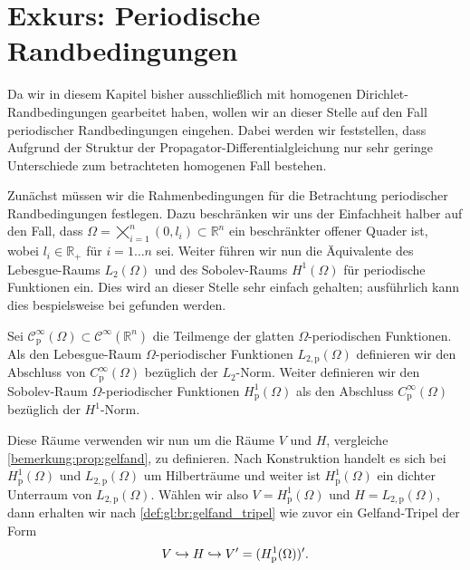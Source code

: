 

\section{Exkurs: Periodische Randbedingungen} %
\label{sec:ps:pr:periodische_randbedingungen}

Da wir in diesem Kapitel bisher ausschließlich mit homogenen Dirichlet-Randbedingungen gearbeitet haben, wollen wir an dieser Stelle auf den Fall periodischer Randbedingungen eingehen.
Dabei werden wir feststellen, dass Aufgrund der Struktur der Propagator-Differentialgleichung nur sehr geringe Unterschiede zum betrachteten homogenen Fall bestehen.

Zunächst müssen wir die Rahmenbedingungen für die Betrachtung periodischer Randbedingungen festlegen.
Dazu beschränken wir uns der Einfachheit halber auf den Fall, dass $\Omega = \bigtimes_{i = 1}^{n} (0, l_{i}) \subset \mathbb{R}^{n}$ ein beschränkter offener Quader ist, wobei $l_{i} \in \mathbb{R}_{+}$ für $i = 1 \dots n$ sei.
Weiter führen wir nun die Äquivalente des Lebesgue-Raums $L_{2}(\Omega)$ und des Sobolev-Raums $H^{1}(\Omega)$ für periodische Funktionen ein.
Dies wird an dieser Stelle sehr einfach gehalten; ausführlich kann dies bespielsweise bei \cite{??} gefunden werden.

\begin{Definition}
    Sei $\mathcal C_{\text{p}}^{\infty}(\Omega) \subset \mathcal C^{\infty}(\mathbb{R}^{n})$ die Teilmenge der glatten $\Omega$-periodischen Funktionen.
    Als den Lebesgue-Raum $\Omega$-periodischer Funktionen $L_{2,\text{p}}(\Omega)$  definieren wir den Abschluss von $C_{\text{p}}^{\infty}(\Omega)$ bezüglich der $L_{2}$-Norm.
    Weiter definieren wir den Sobolev-Raum $\Omega$-periodischer Funktionen $H^{1}_{\text{p}}(\Omega)$ als den Abschluss $C_{\text{p}}^{\infty}(\Omega)$ bezüglich der $H^{1}$-Norm.
\end{Definition}

Diese Räume verwenden wir nun um die Räume $V$ und $H$, vergleiche \cref{bemerkung:prop:gelfand}, zu definieren.
Nach Konstruktion handelt es sich bei $H^{1}_{\text{p}}(\Omega)$ und $L_{2,\text{p}}(\Omega)$ um Hilberträume und weiter ist $H^{1}_{\text{p}}(\Omega)$ ein dichter Unterraum von $L_{2,\text{p}}(\Omega)$.
Wählen wir also $V = H^{1}_{\text{p}}(\Omega)$ und $H = L_{2,\text{p}}(\Omega)$, dann erhalten wir nach \cref{def:gl:br:gelfand_tripel} wie zuvor ein Gelfand-Tripel der Form
\begin{equation}
    V \hookrightarrow H \hookrightarrow V' = (H^{1}_{\text{p}}(\Omega))'.
\end{equation}

